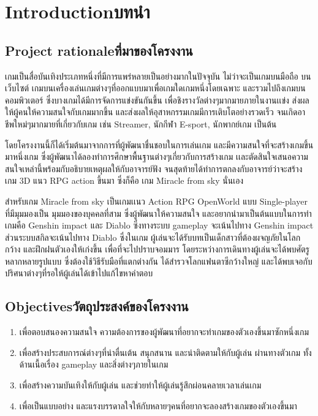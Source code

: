 \chapter{\ifenglish Introduction\else บทนำ\fi}

\section{\ifenglish Project rationale\else ที่มาของโครงงาน\fi}
\enskip \enskip \enskip \enskip \enskip 
เกมเป็นสื่อบันเทิงประเภทหนึ่งที่มีการแพร่หลายเป็นอย่างมากในปัจจุบัน ไม่ว่าจะเป็นเกมบนมือถือ บนเว็บไซต์ เกมบนเครื่องเล่นเกมต่างๆที่ออกแบบมาเพื่อเกมใดเกมหนึ่งโดยเฉพาะ และรวมไปถึงเกมบนคอมพิวเตอร์ ซึ่งบางเกมได้มีการจัดการแข่งขันกันขึ้น เพื่อชิงรางวัลต่างๆมากมายภายในงานเเข่ง ส่งผลให้ผู้คนให้ความสนใจกับเกมมากขึ้น และส่งผลให้อุสาหกรรมเกมมีการเติบโตอย่างรวดเร็ว จนเกิดอาชีพใหม่ๆมากมายที่เกี่ยวกับเกม เช่น Streamer, นักกีฬา E-sport, นักพากย์เกม เป็นต้น   

\enskip \enskip
โดยโครงงานนี้ก็ได้เริ่มต้นมาจากการที่ผู้พัฒนาชื่นชอบในการเล่นเกม และมีความสนใจที่จะสร้างเกมขึ้นมาหนึ่งเกม ซึ่งผู้พัฒนาได้ลองทำการศึกษาพื้นฐานต่างๆเกี่ยวกับการสร้างเกม เเละตัดสินใจเสนอความสนใจเหล่านี้พร้อมกับอธิบายเหตุผลให้กับอาจารย์ฟัง จนสุดท้ายได้ทำการตกลงกับอาจารย์ว่าจะสร้างเกม 3D แนว RPG action ขึ้นมา ซึ่งก็คือ เกม Miracle from sky นั่นเอง 

\enskip \enskip สำหรับเกม Miracle from sky เป็นเกมเเนว Action RPG OpenWorld แบบ Single-player ที่มีมุมมองเป็น มุมมองของบุคคลที่สาม ซึ่งผู้พัฒนาให้ความสนใจ และอยากนำมาเป็นต้นแบบในการทำเกมคือ Genshin impact และ Diablo ซึ่งทางระบบ gameplay จะเน้นไปทาง Genshin impact ส่วนระบบสกิลจะเน้นไปทาง Diablo ซึ่งในเกม ผู้เล่นจะได้รับบทเป็นเด็กสาวที่ต้องผจญภัยในโลกกว้าง และฝึกฝนตัวเองให้เก่งขึ้น เพื่อที่จะไปปราบจอมมาร โดยระหว่างการเดินทางผู้เล่นจะได้พบศัตรูหลากหลายรูปแบบ ซึ่งต้องใช้วิธีรับมือที่แตกต่างกัน ได้สำรวจโลกแฟนตาซีกว้างใหญ่ และได้พบเจอกับปริศนาต่างๆที่รอให้ผู้เล่นได้เข้าไปแก้ไขหาคำตอบ 
\section{\ifenglish Objectives\else วัตถุประสงค์ของโครงงาน\fi}
\begin{enumerate}
    \item เพื่อตอบสนองความสนใจ ความต้องการของผู้พัฒนาที่อยากจะทำเกมของตัวเองขึ้นมาซักหนึ่งเกม
    \item เพื่อสร้างประสบการณ์ต่างๆที่น่าตื่นเต้น สนุกสนาน และน่าติดตามให้กับผู้เล่น ผ่านทางตัวเกม ทั้งด้านเนื้อเรื่อง gameplay และสิ่งต่างๆภายในเกม
    \item เพื่อสร้างความบันเทิงให้กับผู้เล่น และช่วยทำให้ผู้เล่นรู้สึกผ่อนคลายเวลาเล่นเกม
    \item เพื่อเป็นแบบอย่าง และแรงบรรดาลใจให้กับหลายๆคนที่อยากจะลองสร้างเกมของตัวเองขึ้นมา
\end{enumerate}

